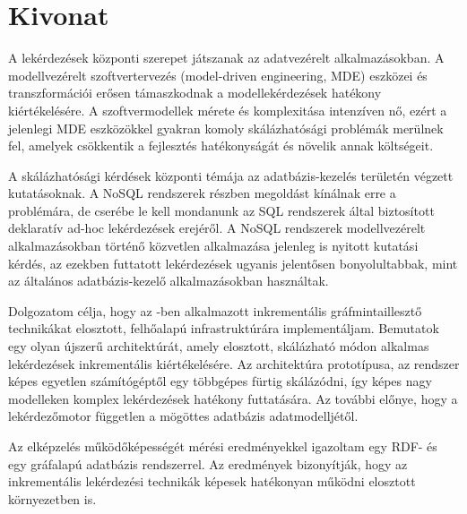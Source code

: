 
\chapter*{Kivonat}

A lekérdezések központi szerepet játszanak az adatvezérelt alkalmazásokban. A modellvezérelt szoftvertervezés (model-driven engineering, MDE) eszközei és transzformációi erősen támaszkodnak a modellekérdezések hatékony kiértékelésére. A szoftvermodellek mérete és komplexitása intenzíven nő, ezért a jelenlegi MDE eszközökkel gyakran komoly skálázhatósági problémák merülnek fel, amelyek csökkentik a fejlesztés hatékonyságát és növelik annak költségeit.

A skálázhatósági kérdések központi témája az adatbázis-kezelés területén végzett kutatásoknak. A NoSQL rendszerek részben megoldást kínálnak erre a problémára, de cserébe le kell mondanunk az SQL rendszerek által biztosított deklaratív ad-hoc lekérdezések erejéről. A NoSQL rendszerek modellvezérelt alkalmazásokban történő közvetlen alkalmazása jelenleg is nyitott kutatási kérdés, az ezekben futtatott lekérdezések ugyanis jelentősen bonyolultabbak, mint az általános adatbázis-kezelő alkalmazásokban használtak.

Dolgozatom célja, hogy az \eiq{}-ben alkalmazott inkrementális gráfmintaillesztő technikákat elosztott, felhőalapú infrastruktúrára implementáljam. Bemutatok egy olyan újszerű architektúrát, amely elosztott, skálázható módon alkalmas lekérdezések inkrementális kiértékelésére. Az architektúra prototípusa, az \iqd{} rendszer képes egyetlen számítógéptől egy többgépes fürtig skálázódni, így képes nagy modelleken komplex lekérdezések hatékony futtatására. Az \iqd{} további előnye, hogy a lekérdezőmotor független a mögöttes adatbázis adatmodelljétől.

Az elképzelés működőképességét mérési eredményekkel igazoltam egy RDF- és egy gráfalapú adatbázis rendszerrel. Az eredmények bizonyítják, hogy az inkrementális lekérdezési technikák képesek hatékonyan működni elosztott környezetben is. 

\vfill


